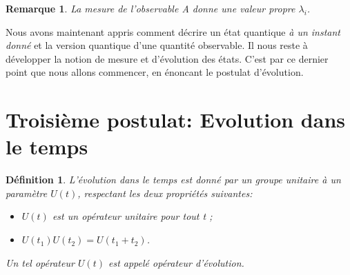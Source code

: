 \documentclass[11pt,twoside,a4paper]{report}
\numberwithin{equation}{part}
\newtheorem{definition}[theorem]{Définition}
\newtheorem{remark}[theorem]{Remarque}
\begin{document}
\begin{remark}
    La mesure de l'observable A donne une valeur propre $\lambda_i$.
\end{remark}

Nous avons maintenant appris comment décrire un état quantique \textit{à un instant donné} et la version quantique d'une quantité observable. Il nous reste à développer la notion de mesure et d'évolution des états. C'est par ce dernier point que nous allons commencer, en énoncant le postulat d'évolution.

\section{Troisième postulat: Evolution dans le temps}

\begin{definition}
    L'évolution dans le temps est donné par un groupe unitaire à un paramètre $U(t)$, respectant les deux propriétés suivantes:
    \begin{itemize}
        \item $U(t)$ est un opérateur unitaire pour tout t ;
        \item $U(t_1)U(t_2)=U(t_1+t_2)$.
    \end{itemize}
    Un tel opérateur $U(t)$ est appelé \emph{opérateur d'évolution}.
\end{definition}
\end{document}
